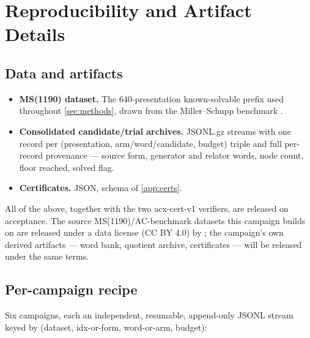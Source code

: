 \section{Reproducibility and Artifact Details}\label{app:repro}

\subsection{Data and artifacts}

\begin{itemize}
  \item \textbf{MS(1190) dataset.} The $640$-presentation known-solvable prefix used
    throughout \ref{sec:methods}, drawn from the Miller--Schupp benchmark
    \cite{miller1999ms}.
  \item \textbf{Consolidated candidate/trial archives.} JSONL.gz streams with one record
    per (presentation, arm/word/candidate, budget) triple and full per-record provenance ---
    source form, generator and relator words, node count, floor reached, solved flag.
  \item \textbf{Certificates.} JSON, schema of \ref{app:certs}.
\end{itemize}

All of the above, together with the two acx-cert-v1 verifiers, are released on acceptance.
The source MS(1190)/AC-benchmark datasets this campaign builds on are released under a data
license (CC BY 4.0) by \cite{fagan2026twohump}; the campaign's own derived artifacts --- word
bank, quotient archive, certificates --- will be released under the same terms.

\subsection{Per-campaign recipe}

Six campaigns, each an independent, resumable, append-only JSONL stream keyed by (dataset,
idx-or-form, word-or-arm, budget):

